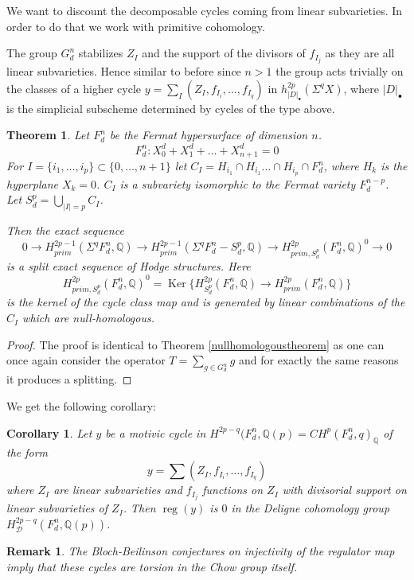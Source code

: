 \documentclass[12pt,reqno]{article}
\newtheorem{thm}[defn]{Theorem}
\newtheorem{cor}[defn]{Corollary}
\newtheorem{rem}[defn]{Remark}
\newcommand {\Q}{{\mathds Q}}
\newcommand {\D}{{\mathcal D}}
\def\Ker{\operatorname{Ker}}
\def\reg{\operatorname{reg}}
\begin{document}
We want to discount the decomposable cycles coming from linear subvarieties. In order to do that we work with primitive cohomology. 


The group $G_d^n$ stabilizes $Z_I$ and the support of the divisors of $f_{I_j}$ as they are all linear subvarieties. Hence similar to before since $n>1$ the group acts trivially on the classes of a higher cycle  $y=\sum_I (Z_I,f_{I_i},\dots,f_{I_q})$ in  $h^{2p}_{|D|_{\bullet}}(\Sigma^q X)$, where $|D|_{\bullet}$ is the simplicial subscheme determined by cycles of the type above. 

\begin{thm} Let $F^n_d$ be the Fermat hypersurface of dimension $n$.
	$$F^n_d:X_0^d+X_1^d+\dots+X_{n+1}^d=0$$
	For $I=\{i_1,\dots,i_p \} \subset \{0,\dots,n+1\}$ let $C_I=H_{i_1} \cap H_{i_1} \dots \cap H_{i_p} \cap F^n_d$, where $H_k$ is the hyperplane $X_k=0$. $C_I$ is a subvariety isomorphic to the Fermat variety $F_d^{n-p}$. Let $S_d^p=\bigcup_{|I|=p} C_I$.
	
	
	Then the exact sequence 
	$$0 \rightarrow H^{2p-1}_{prim}(\Sigma^q F^n_d,\Q) \rightarrow H^{2p-1}_{prim}(\Sigma^q F^n_d-S_d^p,\Q) \rightarrow H^{2p}_{prim,S_d^p}(F_d^n,\Q)^0 \rightarrow 0$$
	is a split exact sequence of Hodge structures. Here 
	$$H^{2p}_{prim,S_d^p}(F_d^n,\Q)^0=\Ker\{H^{2p}_{S_d^p}(F^n_d,\Q) \rightarrow H^{2p}_{prim}(F^n_d,\Q)\}$$
	is the kernel of the cycle class map and is generated by linear combinations of the $C_I$ which are null-homologous.
	\label{higherfermatsplitting} 
\end{thm}

\begin{proof} The proof is identical to Theorem \ref {nullhomologoustheorem} as one can once again consider the operator $T=\sum_{g \in G_d^n} g$ and for exactly the same reasons it produces a splitting. 
	
\end{proof}
We get the following corollary: 
%	
\begin{cor}
	Let $y$ be a motivic cycle in $H^{2p-q}(F_d^n,\Q(p)=CH^p(F_d^n,q)_{\Q}$ of the form 
	$$y=\sum (Z_I,f_{I_i},\dots, f_{I_q})$$
 where $Z_I$ are linear subvarieties and $f_{I_j}$ functions on $Z_I$ with divisorial support on linear subvarieties of $Z_I$. Then $\reg(y)$ is $0$  in the Deligne cohomology group $H^{2p-q}_{\D}(F_d^n,\Q(p))$. 
	\label{higherchowtorsion}
\end{cor}

\begin{rem} The Bloch-Beilinson conjectures on injectivity of the regulator map  imply that these cycles are torsion in the Chow group itself. 
	\end{rem}
	
\end{document}
